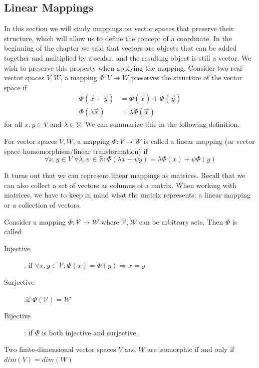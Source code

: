 \subsection*{Linear Mappings}
In this section we will study mappings on vector spaces that preserve their structure, which will allow us to define the concept of a coordinate. In the beginning of the chapter we said that vectors are objects that can be added together and multiplied by a scalar, and the resulting object is still a vector. We wish to preserve this property when applying the mapping. Consider two real vector spaces $V,W$, a mapping $\Phi : V \longrightarrow W $ preserves the structure of the vector space if
\begin{align}
    \Phi(\vec{x}+\vec{y}) &= \Phi(\vec{x})+\Phi(\vec{y})\\
    \Phi(\lambda \vec{x}) &= \lambda \Phi(\vec{x})
\end{align}
for all $x,y \in V$ and $\lambda \in \mathbb{R}$. We can summarize this in the following definition.
\begin{definition}
    For vector spaces $V,W$, a mapping $\Phi : V \longrightarrow W$ is called a linear mapping (or vector space homomorphism/linear transformation) if
    \[
        \forall x,y \in V \; \forall \lambda,\psi \in \mathbb{R}: \Phi(\lambda x+\psi y) = \lambda\Phi(x)+\psi \Phi(y)
    \]
\end{definition}
It turns out that we can represent linear mappings as matrices. Recall that we can also collect a set of vectors as columns of a matrix. When working with matrices, we have to keep in mind what the matrix represents: a linear mapping or a collection of vectors.
\begin{definition}
    Consider a mapping $\Phi : \mathcal{V} \longrightarrow \mathcal{W}$ where $\mathcal{V},\mathcal{W}$ can be arbitrary sets. Then $\Phi$ is called
    \begin{description}
        \item[Injective]: if $\forall x,y \in \mathcal{V}: \Phi(x) = \Phi(y) \Longrightarrow x = y$
        \item[Surjective]:if $\Phi(\mathcal{V}) = \mathcal{W}$
        \item[Bijective]: if $\Phi$ is both injective and surjective.  
    \end{description}
\end{definition}
\begin{theorem}
    Two finite-dimensional vector spaces $V$ and $W$ are isomorphic if and only if $dim(V) = dim(W)$
\end{theorem}
